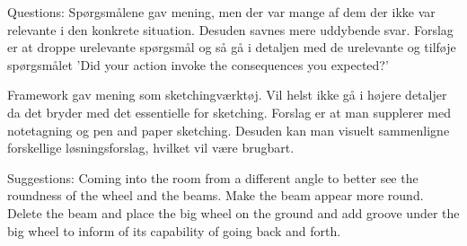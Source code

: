  Questions:
 Spørgsmålene gav mening, men der var mange af dem der ikke var relevante i den konkrete situation. Desuden savnes mere uddybende svar. Forslag er at droppe urelevante spørgsmål og så gå i detaljen med de urelevante og tilføje spørgsmålet 'Did your action invoke the consequences you expected?'

 Framework gav mening som sketchingværktøj. Vil helst ikke gå i højere detaljer da det bryder med det essentielle for sketching. Forslag er at man supplerer med notetagning og pen and paper sketching. Desuden kan man visuelt sammenligne forskellige løsningsforslag, hvilket vil være brugbart.

 Suggestions:
 Coming into the room from a different angle to better see the roundness of the wheel and the beams.
 Make the beam appear more round.
 Delete the beam and place the big wheel on the ground and add groove under the big wheel to inform of its capability of going back and forth.
